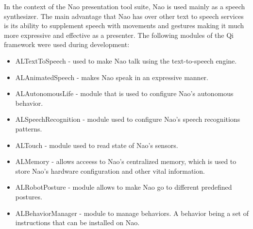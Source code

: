 \documentclass[12pt, fleqn, a4paper]{article}
\begin{document}
In the context of the Nao presentation tool suite, Nao is used mainly as a speech synthesizer. The main advantage that Nao has over other text to speech services is its ability to supplement speech with movements and gestures making it much more expressive and effective as a presenter.
The following modules of the Qi framework were used during development:
\begin{itemize}
	\item ALTextToSpeech - used to make Nao talk using the text-to-speech engine.
	\item ALAnimatedSpeech - makes Nao speak in an expressive manner.
	\item ALAutonomousLife - module that is used to configure Nao's autonomous behavior.
	\item ALSpeechRecognition - module used to configure Nao's speech recognitions patterns.
	\item ALTouch - module used to read state of Nao's sensors.
	\item ALMemory - allows acceess to Nao's centralized memory, which is used to store Nao's hardware configuration and other vital information.
	\item ALRobotPosture - module allows to make Nao go to different predefined postures.
	\item ALBehaviorManager - module to manage behaviors. A behavior being a set of instructions that can be installed on Nao.
\end{itemize}
\end{document}
